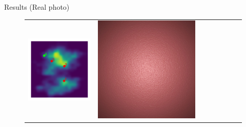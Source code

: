 \documentclass[final]{beamer}
\newlength{\twocolwid}
\newlength{\resultwidth}
\begin{document}
\begin{frame}[t]
\begin{columns}[t]
\begin{column}{\twocolwid}
\begin{block}{Results (Real photo)}
\begin{figure}[t]
\begin{tabular}{ccrclccc}
            		\includegraphics[width=\resultwidth]{real/bump/posterior.pdf} &
            		\includegraphics[width=\resultwidth]{real/bump/good1.jpg} &

\end{tabular}
\end{figure}
\end{block}
\end{column}
\end{columns}
\end{frame}
\end{document}

